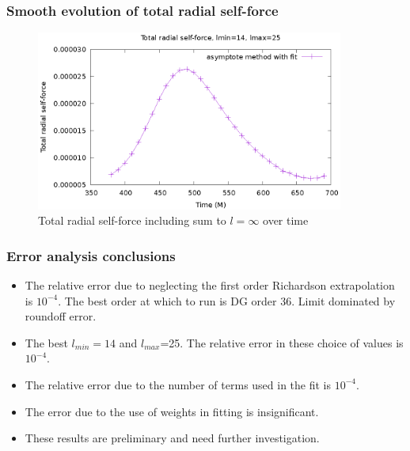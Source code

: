 \documentclass{beamer}
\begin{document}
\begin{frame}
  \frametitle{Smooth evolution of total radial self-force}
  \begin{figure}
    \includegraphics[width=0.9\textwidth]{totalselfforcevt2}
     \caption{Total radial self-force including sum to $l=\infty$ over time}
  \end{figure}
\end{frame}


\begin{frame}
  \frametitle{Error analysis conclusions}
  \begin{itemize}
  \item The relative error due to neglecting the first order Richardson extrapolation is $10^{-4}$. The best order at which to run is DG order 36. Limit dominated by roundoff error.
  \item The best $l_{min}=14$ and $l_{max}$=25. The relative error in these choice of values is $10^{-4}$.
  \item The relative error due to the number of terms used in the fit is $10^{-4}$.
  \item The error due to the use of weights in fitting is insignificant.
  \item These results are preliminary and need further investigation.    
  \end{itemize}
\end{frame}
\end{document}
